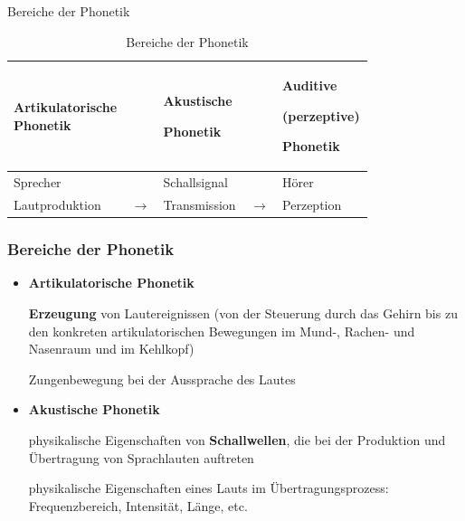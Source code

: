 \begin{frame}{Bereiche der Phonetik}

	\begin{table}
	\centering 
	
		\begin{tabular}{p{0.23\linewidth}p{0.05\linewidth}p{0.23\linewidth}p{0.05\linewidth}p{0.23\linewidth}}
			\hline
			\textbf{Artikulatorische Phonetik} & & \textbf{Akustische}\par \textbf{Phonetik} & & \textbf{Auditive}\par \textbf{(perzeptive)}\par \textbf{Phonetik} \\
			\hline
  			Sprecher & & Schallsignal & & Hörer \\
			\hline
			Lautproduktion & $\rightarrow$ & Transmission & $\rightarrow$ & Perzeption\\
			\hline
		\end{tabular}
		
	\caption{Bereiche der Phonetik \citep{Ramers08a}} 
	\end{table}	
		
\end{frame}


\begin{frame}
\frametitle{Bereiche der Phonetik}

	\begin{itemize}
		\item \textbf{Artikulatorische Phonetik}
		
\textbf{Erzeugung} von Lautereignissen (von der Steuerung durch das Gehirn bis zu den konkreten artikulatorischen Bewegungen im Mund-, Rachen- und Nasenraum und im Kehlkopf)

			\ea Zungenbewegung bei der Aussprache des Lautes \textipa{[ \t{tS} ]}
			\z

\pause 
		
		\item \textbf{Akustische Phonetik}
		
                       physikalische Eigenschaften von \textbf{Schallwellen}, die bei der Produktion und Übertragung von Sprachlauten auftreten

			\ea physikalische Eigenschaften eines Lauts im Übertragungsprozess: Frequenzbereich, Intensität, Länge, etc.
			\z

	\end{itemize}

\end{frame}


